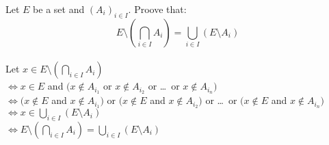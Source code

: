 \documentclass{article}
\begin{document}
\noindent Let $E$ be a set and $(A_i)_{i\in I}$. Proove
that:\\
\[
E \setminus (\bigcap_{i \in I}A_i) =
\bigcup_{i \in I}(E \setminus A_i)
\]\\

\noindent Let $x \in E \setminus (\bigcap_{i \in I}A_i)$\\
$\iff x \in E $ and $(x \notin A_{i_1}  $ or
$ x \notin A_{i_2} $ or \dots \ or $ x \notin A_{i_n})$\\
$\iff (x \notin E $ and $ x \notin A_{i_1}) $ or
$(x \notin E $ and $ x \notin A_{i_2}) $ or \dots\  or
$(x \notin E $ and $ x \notin A_{i_n})$
$\iff  x \in \bigcup_{i \in I}(E \setminus A_i)$\\
$\iff E \setminus (\bigcap_{i \in I}A_i) =
\bigcup_{i \in I}(E \setminus A_i)$
\end{document}

